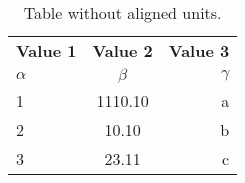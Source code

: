 \documentclass{article}
\begin{document}
	
	\begin{table}[h!]
		\begin{center}
		\caption{Table without aligned units.}
		\label{tab:table1}
		\begin{tabular} {l|c|r}
			\textbf{Value 1} &
			\textbf{Value 2} &
			\textbf{Value 3}  \\
			$\alpha$ &
			$\beta$ &
			$\gamma$ \\ 
			\hline
			1 & 1110.10 & a\\
			2 & 10.10 & b\\
			3 & 23.11 & c
         \end{tabular}
		\end{center}
	\end{table}
\end{document}
